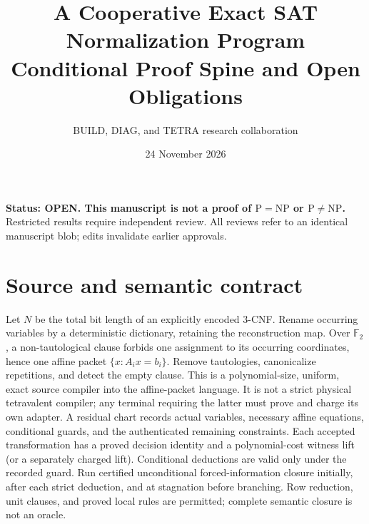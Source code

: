 \documentclass[11pt]{article}
\title{A Cooperative Exact SAT Normalization Program\\Conditional Proof Spine and Open Obligations}
\author{BUILD, DIAG, and TETRA research collaboration}
\date{24 November 2026}
\begin{document}
\maketitle
\noindent\textbf{Status: OPEN. This manuscript is not a proof of $\mathrm{P}=\mathrm{NP}$ or $\mathrm{P}\ne\mathrm{NP}$.} Restricted results require independent review. All reviews refer to an identical manuscript blob; edits invalidate earlier approvals.
\section{Source and semantic contract}\label{sec:source}
Let $N$ be the total bit length of an explicitly encoded 3-CNF. Rename occurring variables by a deterministic dictionary, retaining the reconstruction map. Over $\mathbb F_2$, a non-tautological clause forbids one assignment to its occurring coordinates, hence one affine packet $\{x:A_ix=b_i\}$. Remove tautologies, canonicalize repetitions, and detect the empty clause. This is a polynomial-size, uniform, exact source compiler into the affine-packet language. It is not a strict physical tetravalent compiler; any terminal requiring the latter must prove and charge its own adapter.
A residual chart records actual variables, necessary affine equations, conditional guards, and the authenticated remaining constraints. Each accepted transformation has a proved decision identity and a polynomial-cost witness lift (or a separately charged lift). Conditional deductions are valid only under the recorded guard. Run certified unconditional forced-information closure initially, after each strict deduction, and at stagnation before branching. Row reduction, unit clauses, and proved local rules are permitted; complete semantic closure is not an oracle.
\end{document}
